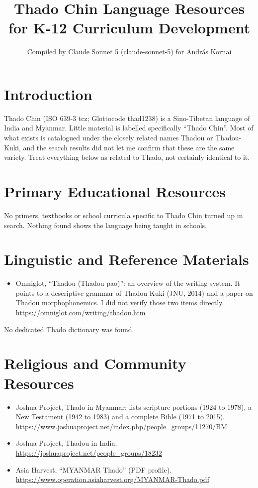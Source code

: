 \documentclass[12pt]{article}
\title{Thado Chin Language Resources for K-12 Curriculum Development}
\author{Compiled by Claude Sonnet 5 (claude-sonnet-5) for Andr\'as Kornai}
\date{}
\begin{document}
\maketitle

\section{Introduction}
Thado Chin (ISO 639-3 tcz; Glottocode thad1238) is a Sino-Tibetan language of India and Myanmar. Little material is labelled specifically ``Thado Chin''. Most of what exists is catalogued under the closely related names Thadou or Thadou-Kuki, and the search results did not let me confirm that these are the same variety. Treat everything below as related to Thado, not certainly identical to it.

\section{Primary Educational Resources}
No primers, textbooks or school curricula specific to Thado Chin turned up in search. Nothing found shows the language being taught in schools.

\section{Linguistic and Reference Materials}
\begin{itemize}
\item Omniglot, ``Thadou (Thadou pao)'': an overview of the writing system. It points to a descriptive grammar of Thadou Kuki (JNU, 2014) and a paper on Thadou morphophonemics. I did not verify those two items directly. \url{https://omniglot.com/writing/thadou.htm}
\end{itemize}
No dedicated Thado dictionary was found.

\section{Religious and Community Resources}
\begin{itemize}
\item Joshua Project, Thado in Myanmar: lists scripture portions (1924 to 1978), a New Testament (1942 to 1983) and a complete Bible (1971 to 2015). \url{https://www.joshuaproject.net/index.php/people_groups/11270/BM}
\item Joshua Project, Thadou in India. \url{https://joshuaproject.net/people_groups/18232}
\item Asia Harvest, ``MYANMAR Thado'' (PDF profile). \url{https://www.operation.asiaharvest.org/MYANMAR-Thado.pdf}
\end{itemize}
\end{document}
